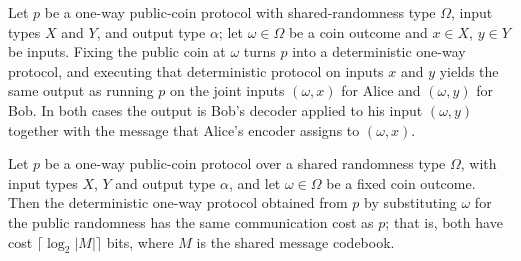 \begin{theorem}
\label{CommunicationComplexity.PublicCoin.OneWay.Protocol.toDeterministic_run}
\leanok
{}
Let $p$ be a one-way public-coin protocol with shared-randomness type $\Omega$, input
types $X$ and $Y$, and output type $\alpha$; let $\omega \in \Omega$ be a coin outcome
and $x \in X$, $y \in Y$ be inputs. Fixing the public coin at $\omega$ turns $p$ into a
deterministic one-way protocol, and executing that deterministic protocol on inputs $x$
and $y$ yields the same output as running $p$ on the joint inputs $(\omega, x)$ for
Alice and $(\omega, y)$ for Bob. In both cases the output is Bob's decoder applied to
his input $(\omega, y)$ together with the message that Alice's encoder assigns to
$(\omega, x)$.
\end{theorem}

\begin{theorem}
\label{CommunicationComplexity.PublicCoin.OneWay.Protocol.toDeterministic_cost}
\leanok
{}
Let $p$ be a one-way public-coin protocol over a shared randomness type $\Omega$, with
input types $X$, $Y$ and output type $\alpha$, and let $\omega \in \Omega$ be a fixed
coin outcome. Then the deterministic one-way protocol obtained from $p$ by substituting
$\omega$ for the public randomness has the same communication cost as $p$; that is, both
have cost $\lceil \log_2 |M| \rceil$ bits, where $M$ is the shared message codebook.
\end{theorem}

